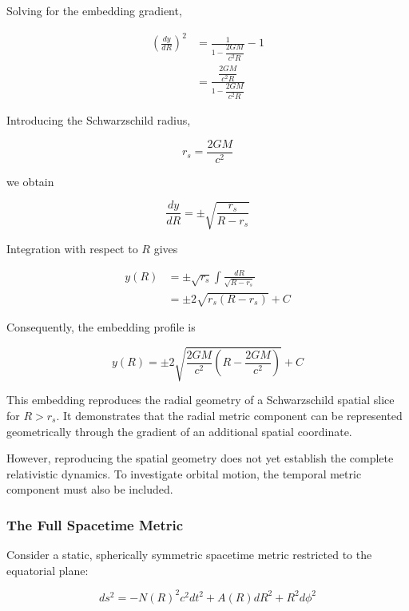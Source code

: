 \documentclass[pdflatex,sn-mathphys-num]{sn-jnl}%
\theoremstyle{thmstyleone}%
\theoremstyle{thmstyletwo}%
\theoremstyle{thmstylethree}%
\begin{document}
\begin{appendices}
Solving for the embedding gradient,

\begin{align}
    \left(\frac{dy}{dR}\right)^2
    &=
    \frac{1}{1-\dfrac{2GM}{c^2R}}-1 \\[4pt]
    &=
    \frac{\dfrac{2GM}{c^2R}}
    {1-\dfrac{2GM}{c^2R}}
\end{align}

Introducing the Schwarzschild radius,

\begin{equation}
    r_s=\frac{2GM}{c^2}
\end{equation}

we obtain

\begin{equation}
    \boxed{
    \frac{dy}{dR}
    =
    \pm\sqrt{\frac{r_s}{R-r_s}}
    }
\end{equation}

Integration with respect to $R$ gives

\begin{align}
    y(R)
    &=
    \pm\sqrt{r_s}
    \int\frac{dR}{\sqrt{R-r_s}} \\[4pt]
    &=
    \pm2\sqrt{r_s(R-r_s)}+C
\end{align}

Consequently, the embedding profile is

\begin{equation}
    \boxed{
    y(R)
    =
    \pm2\sqrt{
        \frac{2GM}{c^2}
        \left(R-\frac{2GM}{c^2}\right)
    }+C
    }
\end{equation}

This embedding reproduces the radial geometry of a Schwarzschild spatial slice for $R>r_s$. It demonstrates that the radial metric component can be represented geometrically through the gradient of an additional spatial coordinate.

However, reproducing the spatial geometry does not yet establish the complete relativistic dynamics. To investigate orbital motion, the temporal metric component must also be included.

\subsubsection{The Full Spacetime Metric}

Consider a static, spherically symmetric spacetime metric restricted to the equatorial plane:

\begin{equation}
    ds^2
    =
    -N(R)^2c^2dt^2
    +
    A(R)dR^2
    +
    R^2d\phi^2
\end{equation}


\end{appendices}
\end{document}

